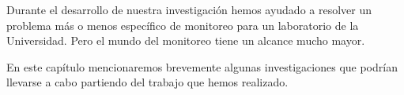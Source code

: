Durante el desarrollo de nuestra investigación hemos ayudado a resolver un
problema más o menos específico de monitoreo para un laboratorio de la
Universidad. Pero el mundo del monitoreo tiene un alcance mucho mayor.

En este capítulo mencionaremos brevemente algunas investigaciones que podrían
llevarse a cabo partiendo del trabajo que hemos realizado.
